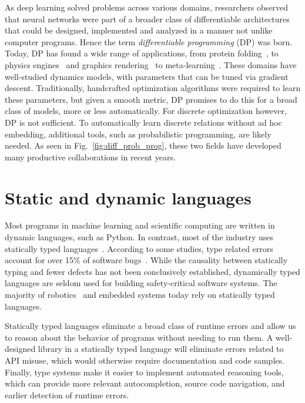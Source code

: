 \documentclass[12pt,initial,twoside,maitrise]{dms}
\numberwithin{equation}{section}
\numberwithin{table}{chapter}
\numberwithin{figure}{chapter}
\begin{document}
As deep learning solved problems across various domains, researchers observed that neural networks were part of a broader class of differentiable architectures that could be designed, implemented and analyzed in a manner not unlike computer programs. Hence the term \textit{differentiable programming} (DP) was born. Today, DP has found a wide range of applications, from protein folding~\citep{alquraishi2018end}, to physics engines~\citep{de2018end,DBLP:journals_corr_DegraveHDW16} and graphics rendering~\citep{loper2014opendr} to meta-learning~\citep{liu2018darts}. These domains have well-studied dynamics models, with parameters that can be tuned via gradient descent. Traditionally, handcrafted optimization algorithms were required to learn these parameters, but given a smooth metric, DP promises to do this for a broad class of models, more or less automatically. For discrete optimization however, DP is not sufficient. To automatically learn discrete relations without ad hoc embedding, additional tools, such as probabilistic programming, are likely needed. As seen in Fig.~\ref{fig:diff_prob_prog}, these two fields have developed many productive collaborations in recent years.

\section{Static and dynamic languages}

Most programs in machine learning and scientific computing are written in dynamic languages, such as Python. In contrast, most of the industry uses statically typed languages~\citep{github}. According to some studies, type related errors account for over 15\% of software bugs~\citep{gao2017type}. While the causality between statically typing and fewer defects has not been conclusively established, dynamically typed languages are seldom used for building safety-critical software systems. The majority of robotics~\citep{Areserio54:online} and embedded systems today rely on statically typed languages.

Statically typed languages eliminate a broad class of runtime errors and allow us to reason about the behavior of programs without needing to run them. A well-designed library in a statically typed language will eliminate errors related to API misuse, which would otherwise require documentation and code samples. Finally, type systems make it easier to implement automated reasoning tools, which can provide more relevant autocompletion, source code navigation, and earlier detection of runtime errors.
\end{document}
